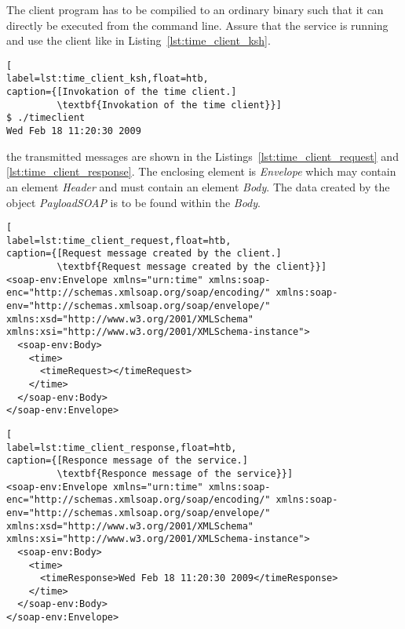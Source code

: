 The client program has to be compilied to an ordinary binary such that it can directly be executed from the command line.
Assure that the service is running and use the client like in Listing~\ref{lst:time_client_ksh}.
\begin{lstlisting}[
label=lst:time_client_ksh,float=htb,
caption={[Invokation of the time client.]
         \textbf{Invokation of the time client}}]
$ ./timeclient
Wed Feb 18 11:20:30 2009
\end{lstlisting}
the transmitted messages are shown in the Listings~\ref{lst:time_client_request} and \ref{lst:time_client_response}.
The enclosing element is \textit{Envelope} which may contain an element \textit{Header} and must contain an element \textit{Body}. %
The data created by the object \textit{PayloadSOAP} is to be found within the \textit{Body}.
\begin{lstlisting}[
label=lst:time_client_request,float=htb,
caption={[Request message created by the client.]
         \textbf{Request message created by the client}}]
<soap-env:Envelope xmlns="urn:time" xmlns:soap-enc="http://schemas.xmlsoap.org/soap/encoding/" xmlns:soap-env="http://schemas.xmlsoap.org/soap/envelope/" xmlns:xsd="http://www.w3.org/2001/XMLSchema" xmlns:xsi="http://www.w3.org/2001/XMLSchema-instance">
  <soap-env:Body>
    <time>
      <timeRequest></timeRequest>
    </time>
  </soap-env:Body>
</soap-env:Envelope>
\end{lstlisting}


\begin{lstlisting}[
label=lst:time_client_response,float=htb,
caption={[Responce message of the service.]
         \textbf{Responce message of the service}}]
<soap-env:Envelope xmlns="urn:time" xmlns:soap-enc="http://schemas.xmlsoap.org/soap/encoding/" xmlns:soap-env="http://schemas.xmlsoap.org/soap/envelope/" xmlns:xsd="http://www.w3.org/2001/XMLSchema" xmlns:xsi="http://www.w3.org/2001/XMLSchema-instance">
  <soap-env:Body>
    <time>
      <timeResponse>Wed Feb 18 11:20:30 2009</timeResponse>
    </time>
  </soap-env:Body>
</soap-env:Envelope>
\end{lstlisting}


















